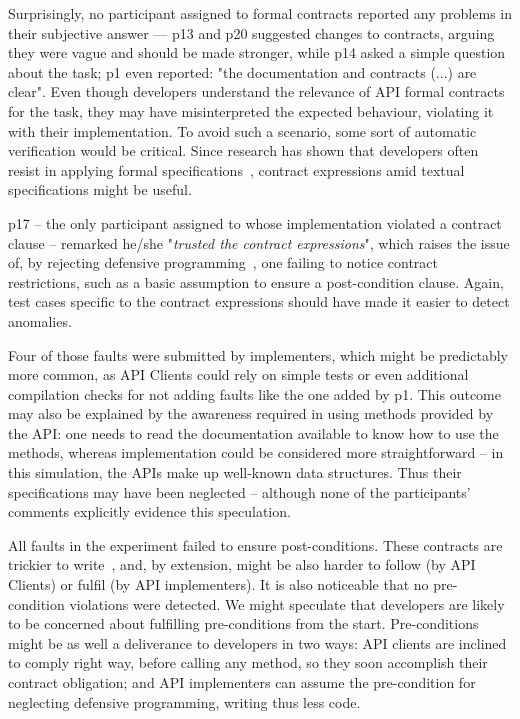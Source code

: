 Surprisingly, no participant assigned to formal contracts reported any problems in their subjective answer –– p13 and p20 suggested changes to contracts, arguing they were vague and should be made stronger, while p14 asked a simple question about the task; p1 even reported: "the documentation and contracts (...) are clear".
Even though developers understand the relevance of API formal contracts for the task, they may have misinterpreted the expected behaviour, violating it with their implementation.
To avoid such a scenario, some sort of automatic verification would be critical.
Since research has shown that developers often resist in applying formal specifications~\cite{Polikarpova-etal09,Estler-etal14}, contract expressions amid textual specifications might be useful.

p17 -- the only participant assigned to \contractjdoc{} whose implementation violated a contract clause -- remarked he/she "\emph{trusted the contract expressions}", 
which raises the issue of, by rejecting defensive programming~\cite{dbc}, one failing to notice contract restrictions, such as a basic assumption to ensure a post-condition clause.
Again, test cases specific to the contract expressions should have made it easier to detect anomalies.

Four of those faults were submitted by implementers, which might be predictably more common, as API Clients could rely on simple tests or even additional compilation checks for not adding faults like the one added by p1.
This outcome may also be explained by the awareness required in using methods provided by the API: one needs to read the documentation available to know how to use the methods, whereas implementation could be considered more straightforward -- in this simulation, 
the APIs make up well-known data structures. Thus their specifications may have been neglected -- although none of the participants' comments explicitly evidence this speculation.

All faults in the experiment failed to ensure post-conditions. 
These contracts are trickier to write~\cite{Rosenblum}, and, by extension, might be also harder to follow (by API Clients) or fulfil (by API implementers). 
It is also noticeable that no pre-condition violations were detected. We might speculate that developers are likely to be concerned about fulfilling pre-conditions from the start. Pre-conditions might be as well a deliverance to developers in two ways: API clients are inclined to comply right way, before calling any method, so they soon accomplish their contract obligation; and API implementers can assume the pre-condition for neglecting defensive programming, writing thus less code.

